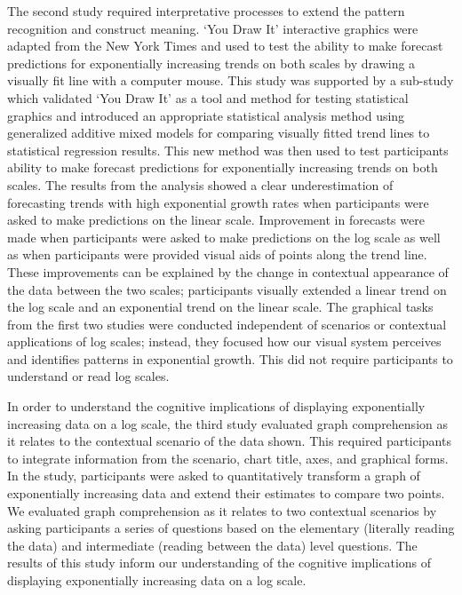\documentclass[print]{nuthesis}
\begin{document}
The second study required interpretative processes to extend the pattern recognition and construct meaning.
`You Draw It' interactive graphics were adapted from the New York Times and used to test the ability to make forecast predictions for exponentially increasing trends on both scales by drawing a visually fit line with a computer mouse.
This study was supported by a sub-study which validated `You Draw It' as a tool and method for testing statistical graphics and introduced an appropriate statistical analysis method using generalized additive mixed models for comparing visually fitted trend lines to statistical regression results.
This new method was then used to test participants ability to make forecast predictions for exponentially increasing trends on both scales.
The results from the analysis showed a clear underestimation of forecasting trends with high exponential growth rates when participants were asked to make predictions on the linear scale.
Improvement in forecasts were made when participants were asked to make predictions on the log scale as well as when participants were provided visual aids of points along the trend line.
These improvements can be explained by the change in contextual appearance of the data between the two scales; participants visually extended a linear trend on the log scale and an exponential trend on the linear scale.
The graphical tasks from the first two studies were conducted independent of scenarios or contextual applications of log scales; instead, they focused how our visual system perceives and identifies patterns in exponential growth.
This did not require participants to understand or read log scales.

In order to understand the cognitive implications of displaying exponentially increasing data on a log scale, the third study evaluated graph comprehension as it relates to the contextual scenario of the data shown.
This required participants to integrate information from the scenario, chart title, axes, and graphical forms.
In the study, participants were asked to quantitatively transform a graph of exponentially increasing data and extend their estimates to compare two points.
We evaluated graph comprehension as it relates to two contextual scenarios by asking participants a series of questions based on the elementary (literally reading the data) and intermediate (reading between the data) level questions.
The results of this study inform our understanding of the cognitive implications of displaying exponentially increasing data on a log scale.
\end{document}
